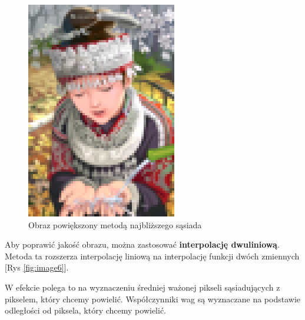 \begin{figure}[ht]
\begin{minipage}[t]{0.32\linewidth}
        \includegraphics[width=\linewidth]{Rozdziały/02.Podstawy_teoretyczne/comic_NN_x4.png}
        \caption{Obraz powiększony metodą najbliższego sąsiada}
        \label{fig:image5}
    \end{minipage}
  \end{figure}


Aby poprawić jakość obrazu, można zastosować \textbf{interpolację dwuliniową}. Metoda ta rozszerza interpolację liniową na interpolację funkcji dwóch zmiennych [Rys \ref{fig:image6}]. 

W efekcie polega to na wyznaczeniu średniej ważonej pikseli sąsiadujących z pikselem, który chcemy powielić. Współczynniki wag są wyznaczane na podstawie odległości od piksela, który chcemy powielić.

